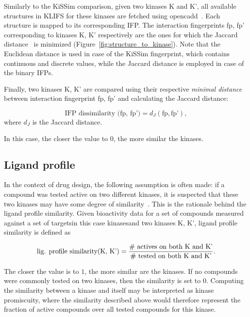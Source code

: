 \documentclass[9pt,training]{livecoms}
\newcommand{\kinA}{K}
\newcommand{\kinB}{K'}
\begin{document}
Similarly to the KiSSim comparison, given two kinases \kinA{} and \kinB{}, all available structures in KLIFS for these kinases are fetched using opencadd~\cite{Sydow_2022_JOSS}. Each structure is mapped to its corresponding IFP. The interaction fingerprints fp, fp' corresponding to kinases \kinA{}, \kinB{} respectively are the ones for which the Jaccard distance~\cite{Kosub_2019_jpatrec} is minimized (Figure~\ref{fig:structure_to_kinase}). Note that the Euclidean distance is used in case of the KiSSim fingerprint, which contains continuous and discrete values, while the Jaccard distance is employed in case of the binary IFPs.

Finally, two kinases \kinA{}, \kinB{} are compared using their respective \textit{minimal distance} between interaction fingerprint fp, fp' and calculating the Jaccard distance:

\begin{equation}
    \text{IFP dissimilarity (fp, fp')} = d_J(\text{fp}, \text{fp'}),
\end{equation}
where $d_J$ is the Jaccard distance.

In this case, the closer the value to $0$, the more similar the kinases.

\subsection{Ligand profile}
In the context of drug design, the following assumption is often made: if a compound was tested active on two different kinases, it is suspected that these two kinases may have some degree of similarity~\cite{Barelier_2015_ACSChemBio}. This is the rationale behind the ligand profile similarity.
Given bioactivity data for a set of compounds measured against a set of targets\textemdash in this case kinases\textemdash and two kinases \kinA{}, \kinB{}, ligand profile similarity is defined as

\begin{equation}
    \text{lig. profile similarity(\kinA{}, \kinB{})} = \\
\frac{
    \#\text{ actives on both \kinA{} and \kinB{}}}
    {\#\text{ tested on both \kinA{} and \kinB{}}
    }.
\end{equation}

The closer the value is to $1$, the more similar are the kinases.
If no compounds were commonly tested on two kinases, then the similarity is set to $0$.
Computing the similarity between a kinase and itself may be interpreted as kinase promiscuity, where the similarity described above would therefore represent the fraction of active compounds over all tested compounds for this kinase.
\end{document}
